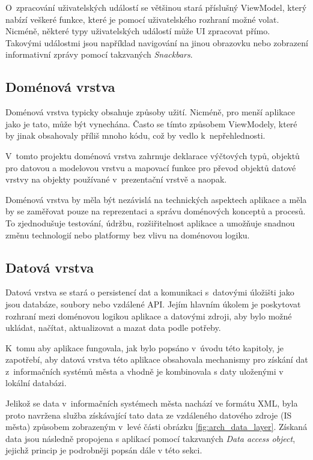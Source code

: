 O~zpracování uživatelských událostí se většinou stará příslušný ViewModel, který nabízí veškeré funkce, které je pomocí uživatelského rozhraní možné volat.
Nicméně, některé typy uživatelských událostí může UI zpracovat přímo. Takovými událostmi jsou například navigování na jinou obrazovku nebo zobrazení 
informativní zprávy pomocí takzvaných \textit{Snackbars}.

\subsection*{Doménová vrstva}
Doménová vrstva typicky obsahuje způsoby užití. Nicméně, pro menší aplikace jako je tato, může být vynechána. \cite{domainLayerAnd} Často se tímto 
způsobem  ViewModely, které by jinak obsahovaly příliš mnoho kódu, což by vedlo k~nepřehlednosti.

V~tomto projektu doménová vrstva zahrnuje deklarace výčtových typů, objektů pro datovou a modelovou vrstvu a mapovací funkce pro převod
objektů datové vrstvy na objekty používané v~prezentační vrstvě a naopak.

Doménová vrstva by měla být nezávislá na technických aspektech aplikace a měla by se zaměřovat pouze na reprezentaci a správu doménových
 konceptů a procesů. To zjednodušuje testování, údržbu, rozšiřitelnost aplikace a umožňuje snadnou změnu technologií nebo platformy bez 
 vlivu na doménovou logiku.

\subsection*{Datová vrstva}


Datová vrstva se stará o persistencí dat a komunikaci s~datovými úložišti jako jsou
databáze, soubory nebo vzdálené API. Jejím hlavním úkolem je poskytovat rozhraní mezi doménovou logikou aplikace a datovými zdroji, 
aby bylo možné ukládat, načítat, aktualizovat a mazat data podle potřeby. \cite{datalayer}

K~tomu aby aplikace fungovala, jak bylo popsáno v~úvodu této kapitoly, je zapotřebí, aby datová vrstva této aplikace obsahovala mechanismy pro
 získání dat z~informačních systémů města a vhodně je kombinovala s daty uloženými v lokální databázi.
 
Jelikož se data v~informačních systémech města nachází ve formátu XML, byla proto navržena služba získávající tato data ze vzdáleného 
datového zdroje (IS města) způsobem zobrazeným v~levé části obrázku \ref{fig:arch_data_layer}. Získaná data jsou následně propojena s aplikací
pomocí takzvaných \textit{Data access object}, jejichž princip je podrobněji popsán dále v této sekci.

